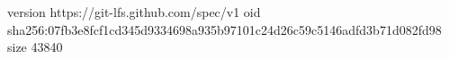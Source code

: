 version https://git-lfs.github.com/spec/v1
oid sha256:07fb3e8fcf1cd345d9334698a935b97101c24d26c59c5146adfd3b71d082fd98
size 43840
